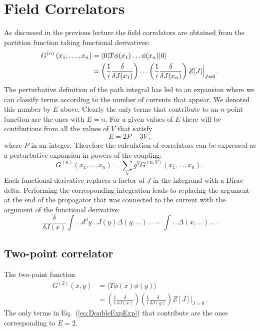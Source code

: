 \renewcommand{\tphi}{\tilde{\phi}}
\renewcommand{\tj}{\tilde{J}}
\renewcommand{\tchi}{\tilde{\chi}}

\section{Field Correlators}
\label{sec:field-correlators}

As discussed in the previous lecture the field correlators are
obtained from the partition function taking functional derivatives: 
\begin{align}
  \label{eq:CorrDefnPts}
  G^{(n)}\left(x_1, \ldots, x_n\right) 
  &=
    \langle 0 | T \phi(x_1) \ldots \phi(x_n) | 0 \rangle  \\
  \label{eq:CorrDerivGen}
  &= 
    \left(\frac{1}{i} \frac{\delta}{\delta J(x_1)}\right)
    \ldots
    \left(\frac{1}{i} \frac{\delta}{\delta J(x_n)}\right)
    Z[J]\Big|_{J=0} \, .
\end{align}
The perturbative definition of the path integral has led to an
expansion where we can classify terms according to the number of
currents that appear. We denoted this number by $E$ above. Clearly the
only terms that contribute to an $n$-point function are the ones with
$E=n$. For a given values of $E$ there will be contibutions from all
the values of $V$ that satisfy
\[
  E =2P- 3V\, ,
\]
where $P$ in an integer. Therefore the calculation of correlators can
be expressed as a perturbative expansion in powers of the coupling:
\begin{equation}
  \label{eq:CorrPertTh}
  G^{(n)}\left(x_1, \ldots, x_n\right) = 
  \sum_V g^V G^{(n,V)} \left(x_1, \ldots, x_n\right) \, .
\end{equation}
Each functional derivative replaces a factor
of $J$ in the integrand with a Dirac delta. Performing the
corresponding integration leads to replacing the argument at the end
of the propagator that was connected to the current with the argument
of the functional derivative:
\begin{equation}
  \label{eq:DeltaReplace}
  \frac{\delta}{\delta J(x)} \int \ldots d^dy \ldots J(y) \Delta(y,
  \ldots) \ldots =  \int \ldots \Delta(x,\ldots) \ldots\, .
\end{equation}

\subsection{Two-point correlator}
\label{sec:two-point-correlator}

 The two-point function
\begin{align}
  \label{eq:TwoPtOne}
  G^{(2)}(x,y) 
  &= 
    \langle T \phi(x) \phi(y) \rangle \\
  &= 
    \left(\frac{1}{i} \frac{\delta}{\delta J(x)}\right)
    \left(\frac{1}{i} \frac{\delta}{\delta J(y)}\right)
    Z[J]\Big|_{J=0} \, .
\end{align}
The only terms in Eq.~(\ref{eq:DoubleExpExp}) that contribute are the
ones corresponding to $E=2$. 

